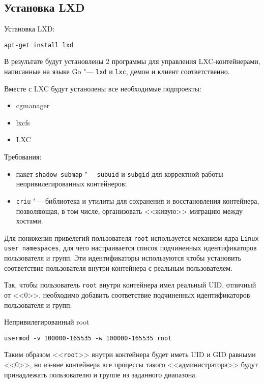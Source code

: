 \documentclass[10pt, a5paper]{article}
\begin{document}
\subsection*{Установка LXD}
Установка LXD:
\begin{verbatim}
apt-get install lxd
\end{verbatim}

В результате будут установлены 2 программы для управления LXC-контейнерами, написанные на 
языке Go "--- {\tt lxd} и {\tt lxc}, демон и клиент соответственно.

Вместе с LXC будут устанолены все необходимые подпроекты:
\begin{itemize}
    \item cgmanager
    \item lxcfs
    \item LXC
\end{itemize}

Требования:
\begin{itemize}
    \item пакет {\tt shadow-submap} "--- {\tt subuid} и {\tt subgid} для 
          корректной работы непривилегированных контейнеров;
    \item {\tt criu} "--- библиотека и утилиты для сохранения и
        восстановления контейнера, позволяющая, в том числе, организовать
        <<живую>> миграцию между хостами.
\end{itemize}

Для понижения привелегий пользователя {\tt root} используется
механизм ядра {\tt Linux user namespaces}, для чего настраивается
список подчиненных идентификаторов пользователя и групп.
Эти идентификаторы используются чтобы установить соответствие пользователя
внутри контейнера с реальным пользователем.

Так, чтобы пользователь {\tt root} внутри контейнера имел реальный UID,
отличный от <<0>>, необходимо добавить соответствие 
подчиненных идентификаторов пользователя и групп:

\begin{frame}{Непривилегированный root}

\begin{verbatim}
usermod -v 100000-165535 -w 100000-165535 root
\end{verbatim}

Таким образом <<{\tt root}>> внутри контейнера будет иметь UID и GID равными <<0>>,
но из-вне контейнера все процессы такого <<администратора>> будут принадлежать
пользователю и группе из заданного диапазона.
\end{frame}
\end{document}
